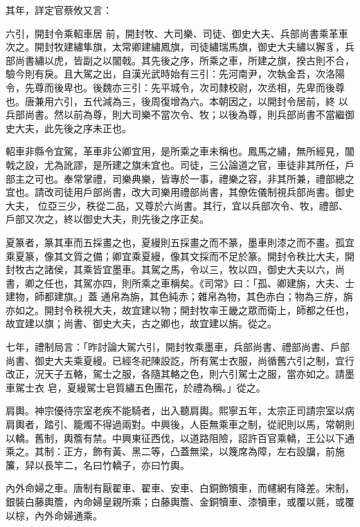 \begin{pinyinscope}
 其年，詳定官蔡攸又言：



 六引，開封令乘軺車居
 前，開封牧、大司樂、司徒、御史大夫、兵部尚書乘革車次之。開封牧建繡隼旗，太常卿建繡鳳旗，司徒繡瑞馬旗，御史大夫繡以獬豸，兵部尚書繡以虎，皆副之以闟戟。其先後之序，所乘之車，所建之旗，揆古則不合，驗今則有戾。且大駕之出，自漢光武時始有三引：先河南尹，次執金吾，次洛陽令，先尊而後卑也。後魏亦三引：先平城令，次司隸校尉，次丞相，先卑而後尊也。唐兼用六引，五代減為三，後周復增為六。本朝因之，以開封令居前，終
 以兵部尚書。然以前為尊，則大司樂不當次令、牧；以後為尊，則兵部尚書不當繼御史大夫，此先後之序未正也。



 軺車非縣令宜駕，革車非公卿宜用，是所乘之車未稱也。鳳馬之繡，無所經見，闟戟之設，尤為訛謬，是所建之旗未宜也。司徒，三公論道之官，車徒非其所任，戶部主之可也。奉常掌禮，司樂典樂，皆專於一事，禮樂之容，非其所兼，禮部總之宜也。請改司徒用戶部尚書，改大司樂用禮部尚書，其僚佐儀制視兵部尚書。御史大夫，
 位亞三少，秩從二品，又尊於六尚書。其行，宜以兵部次令、牧，禮部、戶部又次之，終以御史大夫，則先後之序正矣。



 夏篆者，篆其車而五採畫之也，夏縵則五採畫之而不篆，墨車則漆之而不畫。孤宜乘夏篆，像其文質之備；卿宜乘夏縵，像其文採而不足於篆。開封令秩比大夫，開封牧古之諸侯，其乘皆宜墨車。其駕之馬，令以三，牧以四，御史大夫以六，尚書，卿之任也，其駕亦四，則所乘之車稱矣。《司常》曰：「孤、卿建旃，大夫、士建物，師都建旗。」蓋
 通帛為旃，其色純赤；雜帛為物，其色赤白；物為三斿，旃亦如之。開封令秩視大夫，故宜建以物；開封牧率王畿之眾而衛上，師都之任也，故宜建以旗；尚書、御史大夫，古之卿也，故宜建以旃。從之。



 七年，禮制局言：「昨討論大駕六引，開封牧乘墨車，兵部尚書、禮部尚書、戶部尚書、御史大夫乘夏縵。已經冬祀陳設訖，所有駕士衣服，尚循舊六引之制，宜行改正，況天子五輅，駕士之服，各隨其輅之色，則六引駕士之服，當亦如之。請墨車駕士衣
 皂，夏縵駕士皂質繡五色團花，於禮為稱。」從之。



 肩輿。神宗優待宗室老疾不能騎者，出入聽肩輿。熙寧五年，太宗正司請宗室以病肩輿者，踏引、籠燭不得過兩對。中興後，人臣無乘車之制，從祀則以馬，常朝則以轎。舊制，輿簷有禁。中興東征西伐，以道路阻險，詔許百官乘轎，王公以下通乘之。其制：正方，飾有黃、黑二等，凸蓋無梁，以篾席為障，左右設牖，前施簾，舁以長竿二，名曰竹轎子，亦曰竹輿。



 內外命婦之車。唐制有厭翟車、翟車、安車、白銅飾犢車，而幰網有降差。宋制，銀裝白藤輿簷，內命婦皇親所乘；白藤輿簷、金銅犢車、漆犢車，或覆以氈，或覆以棕，內外命婦通乘。




\end{pinyinscope}
